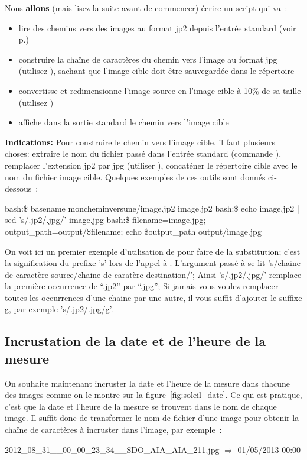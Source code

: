 Nous \textbf{allons} (mais lisez la suite avant de commencer) écrire un script  qui va~:
\begin{itemize}
\item lire des chemins vers des images au format jp2 depuis l'entrée standard (voir p.\pageref{p:entrees_sorties_standards})
\item construire la chaîne de caractères du chemin vers l'image au format jpg (utilisez \sed), sachant que l'image cible doit être sauvegardée dans le répertoire 
\item convertisse et redimensionne l'image source en l'image cible à 10\% de sa taille (utilisez \convert)
\item affiche dans la sortie standard le chemin vers l'image cible 
\end{itemize}

\textbf{Indications:} Pour construire le chemin vers l'image cible, il faut plusieurs choses: extraire le nom du fichier passé dans l'entrée standard (commande \basename), remplacer l'extension jp2 par jpg (utiliser \sed), concaténer le répertoire cible avec le nom du fichier image cible. Quelques exemples de ces outils sont donnés ci-dessous~:
\begin{exempleResultat}
bash:\$ basename moncheminversune/image.jp2
image.jp2
bash:\$ echo image.jp2 | sed 's/.jp2/.jpg/'
image.jpg
bash:\$ filename=image.jpg; output_path=output/\$filename; echo \$output_path
output/image.jpg
\end{exempleResultat}
On voit ici un premier exemple d'utilisation de \sed pour faire de la substitution; c'est la signification du prefixe 's' lors de l'appel à \sed. L'argument passé à \sed se lit 's/chaine de caractère source/chaine de caratère destination/'; Ainsi 's/.jp2/.jpg/' remplace la \underline{première} occurrence de ``.jp2'' par ``.jpg''; Si jamais vous voulez remplacer toutes les occurrences d'une chaine par une autre, il vous suffit d'ajouter le suffixe g, par exemple 's/.jp2/.jpg/g'.

\subsection{Incrustation de la date et de l'heure de la mesure}

On souhaite maintenant incruster la date et l'heure de la mesure dans chacune des images comme on le montre sur la figure~\ref{fig:soleil_date}. Ce qui est pratique, c'est que la date et l'heure de la mesure se trouvent dans le nom de chaque image. Il suffit donc de transformer le nom de fichier d'une image pour obtenir la chaîne de caractères à incruster dans l'image, par exemple~:
\begin{center}
2012\_08\_31\_\_00\_00\_23\_34\_\_SDO\_AIA\_AIA\_211.jpg $\Rightarrow$ 01/05/2013 00:00
\end{center}

